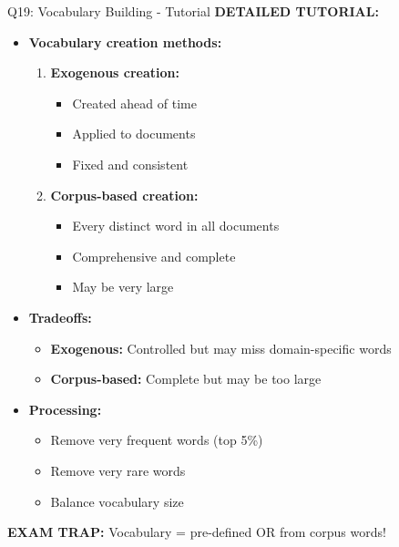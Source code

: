 \documentclass[8pt]{beamer}
\begin{document}
\begin{frame}{Q19: Vocabulary Building - Tutorial}
		\vspace{0.1cm}
		\textbf{DETAILED TUTORIAL:}
		\begin{itemize}
			\item \textbf{Vocabulary creation methods:}
			\begin{enumerate}
				\item \textbf{Exogenous creation:}
				\begin{itemize}
					\item Created ahead of time
					\item Applied to documents
					\item Fixed and consistent
				\end{itemize}
				\item \textbf{Corpus-based creation:}
				\begin{itemize}
					\item Every distinct word in all documents
					\item Comprehensive and complete
					\item May be very large
				\end{itemize}
			\end{enumerate}
			\item \textbf{Tradeoffs:}
			\begin{itemize}
				\item \textbf{Exogenous:} Controlled but may miss domain-specific words
				\item \textbf{Corpus-based:} Complete but may be too large
			\end{itemize}
			\item \textbf{Processing:}
			\begin{itemize}
				\item Remove very frequent words (top 5\%) 
				\item Remove very rare words
				\item Balance vocabulary size
			\end{itemize}
		\end{itemize}
		
		\textcolor{myred}{\textbf{EXAM TRAP:}} Vocabulary = \textcolor{myblue}{pre-defined OR from corpus words}!
	\end{frame}
	
\end{document}
